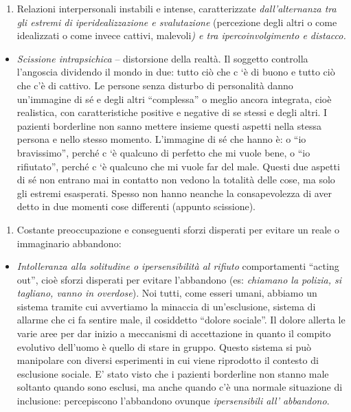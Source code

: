 \documentclass[]{article}
\begin{document}
\begin{enumerate}
\def\labelenumi{\alph{enumi})}
\item
  Relazioni interpersonali instabili e intense, caratterizzate
  \emph{dall'alternanza tra gli estremi di iperidealizzazione e
  svalutazione} (percezione degli altri o come idealizzati o come invece
  cattivi, malevoli\emph{) e tra ipercoinvolgimento e distacco.}
\end{enumerate}

\begin{itemize}
\item
  \emph{\emph{Scissione intrapsichica}} -- distorsione della realtà. Il
  soggetto controlla l'angoscia dividendo il mondo in due: tutto ciò che
  c `è di buono e tutto ciò che c'è di cattivo. Le persone senza
  disturbo di personalità danno un'immagine di sé e degli altri
  ``complessa'' o meglio ancora integrata, cioè realistica, con
  caratteristiche positive e negative di se stessi e degli altri. I
  pazienti borderline non sanno mettere insieme questi aspetti nella
  stessa persona e nello stesso momento. L'immagine di sé che hanno è: o
  ``io bravissimo'', perché c `è qualcuno di perfetto che mi vuole bene,
  o ``io rifiutato'', perché c `è qualcuno che mi vuole far del male.
  Questi due aspetti di sé non entrano mai in contatto non vedono la
  totalità delle cose, ma solo gli estremi esasperati. Spesso non hanno
  neanche la consapevolezza di aver detto in due momenti cose differenti
  (appunto scissione).
\end{itemize}

\begin{enumerate}
\def\labelenumi{\alph{enumi})}
\item
  Costante preoccupazione e conseguenti sforzi disperati per evitare un
  reale o immaginario abbandono:
\end{enumerate}

\begin{itemize}
\item
  \emph{\emph{Intolleranza alla solitudine o ipersensibilità al
  rifiuto}} comportamenti ``acting out'', cioè sforzi disperati per
  evitare l'abbandono (es: \emph{chiamano la polizia, si tagliano, vanno
  in overdose}). Noi tutti, come esseri umani, abbiamo un sistema
  tramite cui avvertiamo la minaccia di un'esclusione, sistema di
  allarme che ci fa sentire male, il cosiddetto ``dolore sociale''. Il
  dolore allerta le varie aree per dar inizio a meccanismi di
  accettazione in quanto il compito evolutivo dell'uomo è quello di
  stare in gruppo. Questo sistema si può manipolare con diversi
  esperimenti in cui viene riprodotto il contesto di esclusione sociale.
  E' stato visto che i pazienti borderline non stanno male soltanto
  quando sono esclusi, ma anche quando c'è una normale situazione di
  inclusione: percepiscono l'abbandono ovunque \emph{ipersensibili all'
  abbandono}.
\end{itemize}
\end{document}
